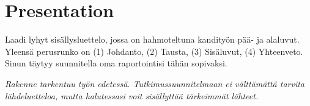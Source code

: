 \documentclass[12pt,a4paper,finnish,oneside]{article}
\begin{document}


\section{Presentation}

Laadi lyhyt sisällysluettelo, jossa on hahmoteltuna kandityön pää- ja
alaluvut. Yleensä perusrunko on
(1) Johdanto,
(2) Tausta,
(3) Sisäluvut,
(4) Yhteenveto.
%
Sinun täytyy suunnitella oma raportointisi tähän sopivaksi. 

\emph{Rakenne tarkentuu työn edetessä. Tutkimussuunnitelmaan ei välttämättä tarvita lähdeluetteloa, mutta halutessasi voit sisällyttää tärkeimmät lähteet.}

%


% 

\renewcommand{\refname}{Lähteet}  %



\end{document}
